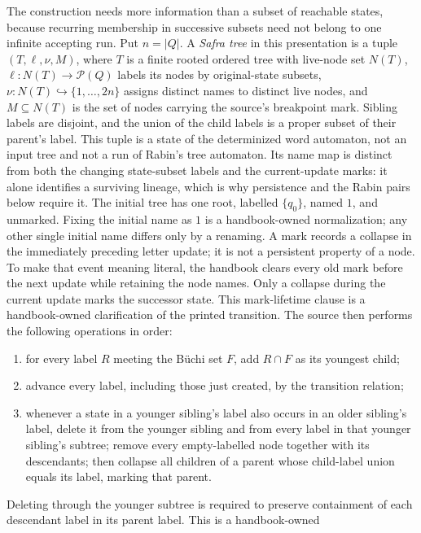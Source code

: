 The construction needs more information than a subset of reachable states,
because recurring membership in successive subsets need not belong to one
infinite accepting run.  Put \(n=|Q|\).  A \emph{Safra tree} in this
presentation is a tuple \((T,\ell,\nu,M)\), where \(T\) is a finite rooted
ordered tree with live-node set \(N(T)\),
\(\ell:N(T)\to\mathcal P(Q)\) labels its nodes by original-state subsets,
\(\nu:N(T)\hookrightarrow\{1,\ldots,2n\}\) assigns distinct names to distinct
live nodes, and \(M\subseteq N(T)\) is the set of nodes carrying the source's
breakpoint mark.  Sibling labels are disjoint, and the union of the child
labels is a proper subset of their parent's label.  This tuple is a state of
the determinized word automaton, not an input tree and not a run of Rabin's
tree automaton.  Its name map is distinct from both the changing state-subset
labels and the current-update marks: it alone identifies a surviving lineage,
which is why persistence and the Rabin pairs below require it.  The initial
tree has one root, labelled \(\{q_0\}\), named \(1\), and unmarked.  Fixing
the initial name as \(1\) is a handbook-owned normalization; any other single
initial name differs only by a renaming.  A mark records a collapse in the
immediately preceding letter update; it is not a persistent property of a
node.  To make that event meaning literal, the
handbook clears every old mark before the next update while retaining the node
names.  Only a collapse during the current update marks the successor state.
This mark-lifetime clause is a handbook-owned clarification of the printed
transition.  The source then performs the following operations in order:
\begin{enumerate}
\item for every label \(R\) meeting the B\"uchi set \(F\), add \(R\cap F\) as
  its youngest child;
\item advance every label, including those just created, by the transition
  relation;
\item whenever a state in a younger sibling's label also occurs in an older
  sibling's label, delete it from the younger sibling and from every label in
  that younger sibling's subtree; remove every empty-labelled node together
  with its descendants; then collapse all children of a parent whose
  child-label union equals its label, marking that parent.
\end{enumerate}
Deleting through the younger subtree is required to preserve containment of
each descendant label in its parent label.  This is a handbook-owned
